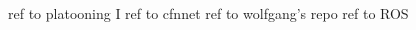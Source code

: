 \documentclass[conference]{IEEEtran}
\begin{document}






\begin{thebibliography}{1}

    ref to platooning I
    ref to cfnnet
    ref to wolfgang's repo
    ref to ROS

\end{thebibliography}

\end{document}
